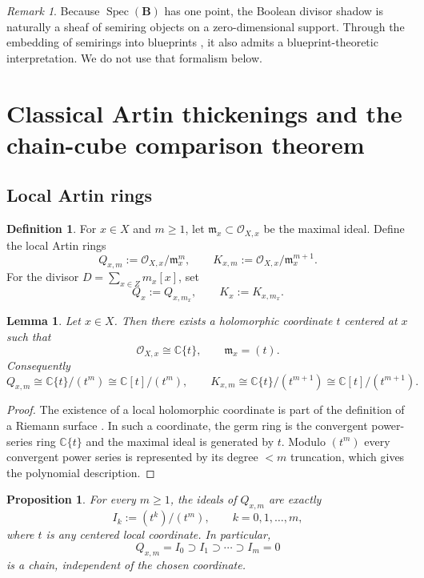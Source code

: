 \documentclass[11pt,a4paper]{article}
\newtheorem{proposition}[theorem]{Proposition}
\newtheorem{lemma}[theorem]{Lemma}
\theoremstyle{definition}
\newtheorem{definition}[theorem]{Definition}
\theoremstyle{remark}
\newtheorem{remark}[theorem]{Remark}
\DeclareMathOperator{\Spec}{Spec}
\newcommand{\CC}{\mathbb C}
\newcommand{\BB}{\mathbf B}
\newcommand{\cO}{\mathcal O}
\begin{document}
\begin{remark}
Because $\Spec(\BB)$ has one point, the Boolean divisor shadow is naturally a sheaf of semiring objects on a zero-dimensional support.  Through the embedding of semirings into blueprints \cite{Lorscheid}, it also admits a blueprint-theoretic interpretation.  We do not use that formalism below.
\end{remark}

\section{Classical Artin thickenings and the chain-cube comparison theorem}

\subsection{Local Artin rings}

\begin{definition}
For $x\in X$ and $m\ge1$, let $\mathfrak m_x\subset\cO_{X,x}$ be the maximal ideal.  Define the local Artin rings
\[
Q_{x,m}:=\cO_{X,x}/\mathfrak m_x^m,
\qquad
K_{x,m}:=\cO_{X,x}/\mathfrak m_x^{m+1}.
\]
For the divisor $D=\sum_{x\in Z}m_x[x]$, set
\[
Q_x:=Q_{x,m_x},\qquad K_x:=K_{x,m_x}.
\]
\end{definition}

\begin{lemma}\label{lem:dvr-local}
Let $x\in X$.  Then there exists a holomorphic coordinate $t$ centered at $x$ such that
\[
\cO_{X,x}\cong\CC\{t\},\qquad \mathfrak m_x=(t).
\]
Consequently
\[
Q_{x,m}\cong\CC\{t\}/(t^m)\cong\CC[t]/(t^m),
\qquad
K_{x,m}\cong\CC\{t\}/(t^{m+1})\cong\CC[t]/(t^{m+1}).
\]
\end{lemma}

\begin{proof}
The existence of a local holomorphic coordinate is part of the definition of a Riemann surface \cite[Chapter~1]{Lee}.  In such a coordinate, the germ ring is the convergent power-series ring $\CC\{t\}$ and the maximal ideal is generated by $t$.  Modulo $(t^m)$ every convergent power series is represented by its degree $<m$ truncation, which gives the polynomial description.
\end{proof}

\begin{proposition}\label{prop:ideal-chain-local}
For every $m\ge1$, the ideals of $Q_{x,m}$ are exactly
\[
I_k:=(t^k)/(t^m),\qquad k=0,1,\dots,m,
\]
where $t$ is any centered local coordinate.  In particular,
\[
Q_{x,m}=I_0\supset I_1\supset\cdots\supset I_m=0
\]
is a chain, independent of the chosen coordinate.
\end{proposition}
\end{document}
